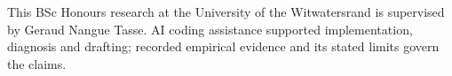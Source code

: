 \documentclass[sigconf,dvipsnames,balance=false]{acmart}
\begin{document}
\begin{acks}
This BSc Honours research at the University of the Witwatersrand is supervised by
Geraud Nangue Tasse. AI coding assistance supported implementation, diagnosis and
drafting; recorded empirical evidence and its stated limits govern the claims.
\end{acks}


\end{document}
